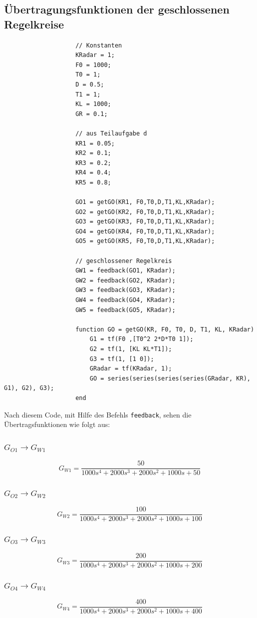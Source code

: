 \documentclass{article}
\begin{document}
			\subsection{Übertragungsfunktionen der geschlossenen Regelkreise}
				\begin{lstlisting}
					// Konstanten
					KRadar = 1;
					F0 = 1000;
					T0 = 1;
					D = 0.5;
					T1 = 1;
					KL = 1000;
					GR = 0.1;

					// aus Teilaufgabe d
					KR1 = 0.05;
					KR2 = 0.1;
					KR3 = 0.2;
					KR4 = 0.4;
					KR5 = 0.8;

					GO1 = getGO(KR1, F0,T0,D,T1,KL,KRadar);
					GO2 = getGO(KR2, F0,T0,D,T1,KL,KRadar);
					GO3 = getGO(KR3, F0,T0,D,T1,KL,KRadar);
					GO4 = getGO(KR4, F0,T0,D,T1,KL,KRadar);
					GO5 = getGO(KR5, F0,T0,D,T1,KL,KRadar);

					// geschlossener Regelkreis
					GW1 = feedback(GO1, KRadar);
					GW2 = feedback(GO2, KRadar);
					GW3 = feedback(GO3, KRadar);
					GW4 = feedback(GO4, KRadar);
					GW5 = feedback(GO5, KRadar);

					function GO = getGO(KR, F0, T0, D, T1, KL, KRadar)
					    G1 = tf(F0 ,[T0^2 2*D*T0 1]);
					    G2 = tf(1, [KL KL*T1]);
					    G3 = tf(1, [1 0]);
					    GRadar = tf(KRadar, 1);
					    GO = series(series(series(series(GRadar, KR), G1), G2), G3);
					end
				\end{lstlisting}
				Nach diesem Code, mit Hilfe des Befehls \lstinline{feedback}, sehen die Übertragsfunktionen wie folgt aus:
				\subsubsection{$G_{O1} \rightarrow G_{W1}$}
					$$G_{W1} = \frac{50}{1000s^4 + 2000s^3 + 2000s^2 + 1000s + 50}$$
				\subsubsection{$G_{O2} \rightarrow G_{W2}$}
					$$G_{W2} = \frac{100}{1000s^4 + 2000s^3 + 2000s^2 + 1000s + 100}$$
				\subsubsection{$G_{O3} \rightarrow G_{W3}$}
					$$G_{W3} = \frac{200}{1000s^4 + 2000s^3 + 2000s^2 + 1000s + 200}$$
				\subsubsection{$G_{O4} \rightarrow G_{W4}$}
					$$G_{W4} = \frac{400}{1000s^4 + 2000s^3 + 2000s^2 + 1000s + 400}$$
\end{document}
